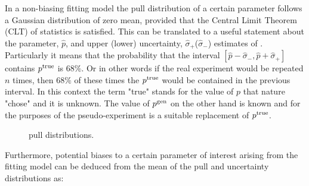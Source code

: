 In a non-biasing fitting model the pull distribution of a certain parameter follows a Gaussian distribution of zero mean,
provided that the Central Limit Theorem (CLT) of statistics is satisfied.
This can be translated to a useful statement about the parameter, $\hat{p}$, and upper (lower) uncertainty, $\hat{\sigma}_+$($\hat{\sigma}_-$)
estimates of . Particularly it means that the probability that the interval
$[\hat{p}-\hat{\sigma}_-,\hat{p}+\hat{\sigma}_+]$ contains $p^{\rm true}$ is $68\%$. Or in other words if the
real experiment would be repeated $n$ times, then $68\%$ of these times the $p^{\rm true}$ would be contained
in the previous interval. In this context the term "true" stands for the value of $p$ that nature "chose"
and it is unknown. The value of $p^{\rm gen}$ on the other hand is known and for the purposes of the pseudo-experiment
is a suitable replacement of $p^{\rm true}$.

\begin{figure}[t]
  \centering
  \begin{subfigure}{0.5\textwidth}
    \raggedright
    \scalebox{0.56}{}
    \caption{}
    \label{pull_ASMag2_bin1}
  \end{subfigure}%
  \hfill%
  \begin{subfigure}{0.5\textwidth}
    \raggedleft
    \scalebox{0.56}{}
    \caption{}
    \label{pull_ASPhase_bin1}
  \end{subfigure}
  \begin{subfigure}{0.5\textwidth}
    \raggedright
    \scalebox{0.56}{}
    \caption{}
    \label{pull_ASMag2_bin2}
  \end{subfigure}%
  \hfill%
  \begin{subfigure}{0.5\textwidth}
    \raggedleft
    \scalebox{0.56}{}
    \caption{}
    \label{pull_ASPhase_bin2}
  \end{subfigure}
  \caption{\swave pull distributions.}
\label{pull_swave_123}
\end{figure}

Furthermore, potential biases to a certain parameter of interest arising from the fitting model
can be deduced from the mean of the pull and uncertainty distributions as:

